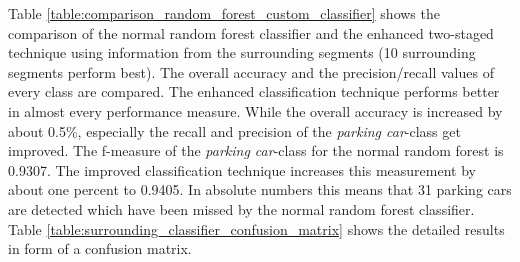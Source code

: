 \begin{table}


\caption{Comparison of the best performing random forest classifier to the best configuration of the proposed two staged classification technique  (two random forests and using 10 surrounding samples) on the filtered dataset.}
\label{table:comparison_random_forest_custom_classifier}
\end{table}
 
 
Table \ref{table:comparison_random_forest_custom_classifier} shows the comparison of the normal random forest classifier and the enhanced two-staged technique using information from the surrounding segments (10 surrounding segments perform best). The overall accuracy and the precision/recall values of every class are compared. The enhanced classification technique performs better in almost every performance measure. While the overall accuracy is increased by about 0.5\%, especially the recall and precision of the \emph{parking car}-class get improved. The f-measure of the \emph{parking car}-class for the normal random forest is 0.9307. The improved classification technique increases this measurement by about one percent to 0.9405. In absolute numbers this means that 31 parking cars are detected which have been missed by the normal random forest classifier. Table \ref{table:surrounding_classifier_confusion_matrix} shows the detailed results in form of a confusion matrix.


